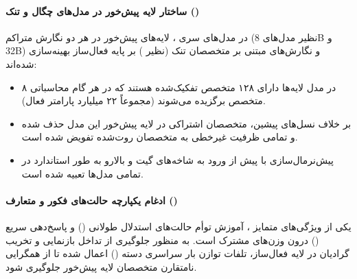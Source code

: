 \item {}

\paragraph*{ساختار لایه پیش‌خور در مدل‌های چگال و تنک ()}
در مدل‌های سری  \cite{qwen2025qwen3}، لایه‌های پیش‌خور در هر دو نگارش متراکم (نظیر مدل‌های 8B و 32B) و نگارش‌های مبتنی بر متخصصان تنک (نظیر ) بر پایه فعال‌ساز  بهینه‌سازی شده‌اند:
\begin{itemize}
    \item در مدل  لایه‌ها دارای ۱۲۸ متخصص تفکیک‌شده هستند که در هر گام محاسباتی ۸ متخصص برگزیده می‌شوند (مجموعاً ۲۲ میلیارد پارامتر فعال).
    \item بر خلاف نسل‌های پیشین، متخصصان اشتراکی در لایه پیش‌خور این مدل حذف شده و تمامی ظرفیت غیرخطی به متخصصان روت‌شده تفویض شده است.
    \item پیش‌نرمال‌سازی با  پیش از ورود به شاخه‌های گیت و بالارو به طور استاندارد در تمامی مدل‌ها تعبیه شده است.
\end{itemize}

\paragraph*{ادغام یکپارچه حالت‌های فکور و متعارف ()}
یکی از ویژگی‌های متمایز ، آموزش توأم حالت‌های استدلال طولانی () و پاسخ‌دهی سریع () درون وزن‌های  مشترک است. به منظور جلوگیری از تداخل بازنمایی و تخریب گرادیان در لایه فعال‌ساز، تلفات توازن بار سراسری دسته () اعمال شده تا از همگرایی نامتقارن متخصصان لایه پیش‌خور جلوگیری شود.

